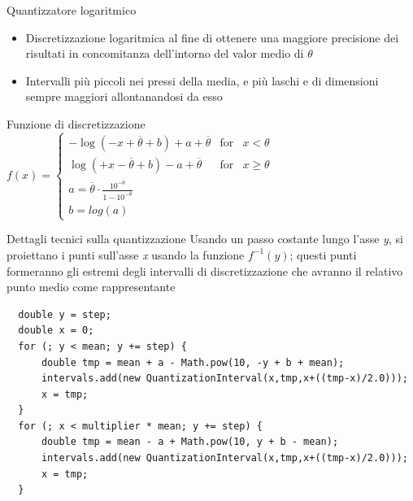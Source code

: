 \documentclass[slidestop,compress,mathserif]{beamer}
\begin{document}
\begin{frame}{Quantizzatore logaritmico}
\vfill
\begin{itemize}
\item Discretizzazione logaritmica al fine di ottenere una maggiore precisione dei risultati in concomitanza dell'intorno del valor medio di $\theta$
\item Intervalli pi\`u piccoli nei pressi della media, e pi\`u laschi e di dimensioni sempre maggiori allontanandosi da esso
\end{itemize}
\begin{block}{Funzione di discretizzazione}
$f(x) =	\left\{ \begin{array}{rcl}  
	-\log(-x+\overline{\theta}+b) + a + \overline{\theta} & \mbox{for} & x<\theta \\ 
	\log(+x-\overline{\theta}+b) - a + \overline{\theta} & \mbox{for} & x\geq\theta \\ 
	a = \overline{\theta}\cdot \frac{10^{-\overline{\theta}}}{1 - 10^{-\overline{\theta}}} & & \\ 
	b = log(a) \end{array} 
 \right.$ 
\end{block}
\vfill
\end{frame}

\begin{frame}[containsverbatim]{Dettagli tecnici sulla quantizzazione}
\vfill
Usando un passo costante lungo l'asse \emph{y}, si proiettano i punti sull'asse \emph{x} usando la funzione $f^{-1}(y)$; questi punti formeranno gli estremi degli intervalli di discretizzazione che avranno il relativo punto medio come rappresentante
\scriptsize
\begin{verbatim}
  double y = step;
  double x = 0;
  for (; y < mean; y += step) {
      double tmp = mean + a - Math.pow(10, -y + b + mean);
      intervals.add(new QuantizationInterval(x,tmp,x+((tmp-x)/2.0)));
      x = tmp;
  }
  for (; x < multiplier * mean; y += step) {
      double tmp = mean - a + Math.pow(10, y + b - mean);
      intervals.add(new QuantizationInterval(x,tmp,x+((tmp-x)/2.0)));
      x = tmp;
  }	
\end{verbatim}
\normalsize
\vfill
\end{frame}

\end{document}
